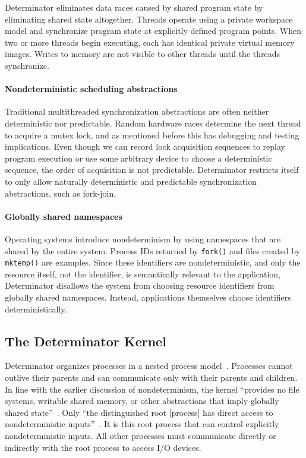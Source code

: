 Determinator eliminates data races caused by shared program state by eliminating
shared state altogether. Threads operate using a private workspace model and
synchronize program state at explicitly defined program points. When two or more
threads begin executing, each has identical private virtual memory images.
Writes to memory are not visible to other threads until the threads synchronize.

\paragraph{Nondeterministic scheduling abstractions}
Traditional multithreaded synchronization abstractions are often neither
deterministic nor predictable. Random hardware races determine the next thread to
acquire a mutex lock, and as mentioned before this has debugging and testing
implications. Even though we can record lock acquisition sequences to replay
program execution or use some arbitrary device to choose a deterministic
sequence, the order of acquisition is not predictable. Determinator restricts
itself to only allow naturally deterministic and predictable synchronization
abstractions, such as fork-join.

\paragraph{Globally shared namespaces}
Operating systems introduce nondeterminism by using namespaces that are shared
by the entire system. Process IDs returned by {\tt fork()} and files created
by {\tt mktemp()} are examples. Since these identifiers are nondeterministic,
and only the resource itself, not the identifier, is semantically relevant to
the application, Determinator disallows the system from choosing resource
identifiers from globally shared namespaces. Instead, applications themselves
choose identifiers deterministically.

\subsection{The Determinator Kernel}

Determinator organizes processes in a nested process model~\cite{Ford96}.
Processes cannot outlive their parents and can communicate only with their
parents and children. In line with the earlier discussion of nondeterminism,
the kernel ``provides no file systems, writable shared memory, or other
abstractions that imply globally shared state''~\cite{Aviram10}. Only ``the
distinguished root [process] has direct access to nondeterministic
inputs''~\cite{Aviram10}. It is this root process that can control explicitly
nondeterministic inputs. All other processes must communicate
directly or indirectly with the root process to access I/O devices.


